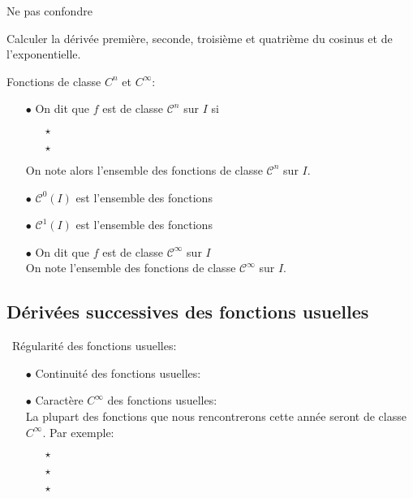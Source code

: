 \documentclass[a4paper, 11pt]{article}
\begin{document}
\noindent \warning  Ne pas confondre \dotfill \vsec
{\footnotesize
	\begin{exercice}
		Calculer la d\'eriv\'ee premi\`ere, seconde, troisi\`eme et quatri\`eme du cosinus et de l'exponentielle.
	\end{exercice}}\vsec\vsec

{\noindent

	\begin{defi} Fonctions de classe $C^n$ et $C^{\infty}$:
		\begin{itemize}
			\item[$\bullet$]  On dit que $f$ est de classe $\mathcal{C}^n$ sur $I$ si  \vsec
			      \begin{itemize}
				      \item[$\star$] \dotfill\vsec
				      \item[$\star$] \dotfill\vsec
			      \end{itemize}
			      On note alors \dotfill l'ensemble des fonctions de classe $\mathcal{C}^n$ sur $I$.\vsec
			\item[$\bullet$] $\mathcal{C}^0(I)$ est l'ensemble des fonctions \dotfill \vsec
			\item[$\bullet$] $\mathcal{C}^1(I)$ est l'ensemble des fonctions \dotfill \vsec
			\item[$\bullet$] On dit que $f$ est de classe $\mathcal{C}^{\infty}$ sur $I$ \dotfill\vsec\\
			      \noindent  On note \dotfill l'ensemble des fonctions de classe $\mathcal{C}^{\infty}$ sur $I$. \vsec
		\end{itemize}
	\end{defi}
}


\subsection{D\'eriv\'ees successives des fonctions usuelles}

\noindent\ {R\'egularit\'e des fonctions usuelles:}\\

\begin{itemize}
	\item[$\bullet$] Continuit\'e des fonctions usuelles:\vsec\\
	      \phantom{\hspace{0cm}} \dotfill\vsec
	\item[$\bullet$] Caract\`{e}re $C^{\infty}$ des fonctions usuelles:\vsec\\
	      La plupart des fonctions que  nous rencontrerons cette ann\'ee seront de classe $C^{\infty}$. Par exemple:\vsec
	      \begin{itemize}
		      \item[$\star$] \dotfill\vsec
		      \item[$\star$] \dotfill\vsec
		      \item[$\star$] \dotfill\vsec
	      \end{itemize}
\end{itemize}
\end{document}
